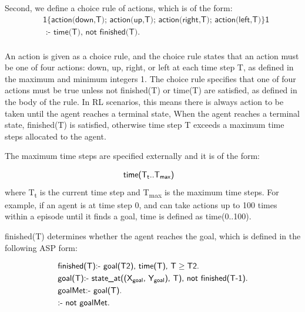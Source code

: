 Second, we define a choice rule of actions, which is of the form:
\begin{equation}\label{eq:choice_rule}
\begin{split}
&\textsf{1\{action(down,T); action(up,T); action(right,T); action(left,T)\}1} \\
&\textsf{ :- time(T), not finished(T).}\\
\end{split}
\end{equation}

An action is given as a choice rule, and the choice rule states that an action must be one of four actions: \textsf{down}, \textsf{up}, \textsf{right}, or \textsf{left}
at each time step T, as defined in the maximum and minimum integers 1.
The choice rule specifies that one of four actions must be true unless \textsf{not finished(T)} or \textsf{time(T)} are satisfied, as defined in the body of the rule.
In RL scenarios, this means there is always action to be taken until the agent reaches a terminal state, 
When the agent reaches a terminal state, \textsf{finished(T)} is satisfied, otherwise time step T exceeds a maximum time steps allocated to the agent.

The maximum time steps are specified externally and it is of the form:

\begin{equation}
\begin{split}
&\textsf{time(T\textsubscript{t}..T\textsubscript{max})}
\end{split}
\end{equation}
where T\textsubscript{t} is the current time step and T\textsubscript{max} is the maximum time steps.
For example, if an agent is at time step 0, and can take actions up to 100 times within a episode until it finds a goal, \textsf{time} is defined as \textsf{time(0..100)}.

\textsf{finished(T)} determines whether the agent reaches the goal, which is defined in the following ASP form:

\begin{equation}\label{eq:asp_goal}
\begin{split}
&\textsf{finished(T):- goal(T2), time(T), T} \geq \textsf{T2.}\\
&\textsf{goal(T):- state\_at((X\textsubscript{goal}, Y\textsubscript{goal}), T), not finished(T-1).}\\
&\textsf{goalMet:- goal(T).}\\
&\textsf{:- not goalMet.}
\end{split}
\end{equation}

